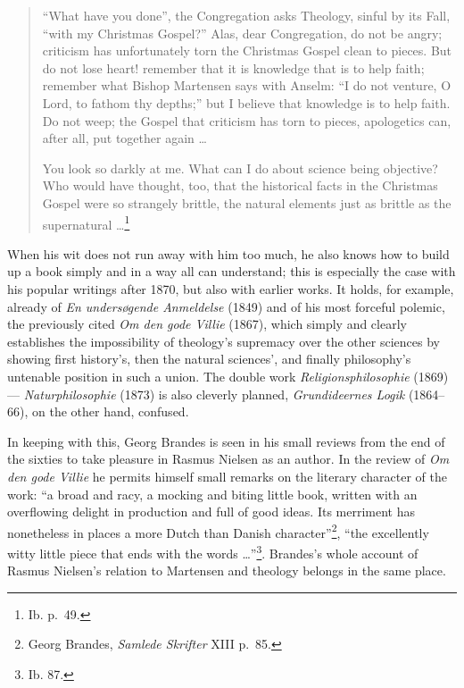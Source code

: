 \documentclass[12pt,a4paper,openany]{book}
\newcommand{\opage}[1]{\marginnote{\footnotesize\textit{[#1]}}}
\begin{document}
\begin{quote}\small

``What have you done'', the Congregation asks Theology, sinful by its Fall, ``with my Christmas Gospel?'' Alas,
dear Congregation, do not be
\opage{150}\setcounter{footnote}{0}%
angry; criticism has unfortunately torn the Christmas Gospel clean to pieces. But do not lose heart! remember that
it is knowledge that is to help faith; remember what Bishop Martensen says with Anselm: ``I do not venture, O Lord,
to fathom thy depths;'' but I believe that knowledge is to help faith. Do not weep; the Gospel that criticism has
torn to pieces, apologetics can, after all, put together again \dots{}

You look so darkly at me. What can I do about science being objective? Who would have thought, too, that the
historical facts in the Christmas Gospel were so strangely brittle, the natural elements just as brittle as the
supernatural \dots{}\footnote{Ib. p.~49.}

\medskip

\end{quote}

When his wit does not run away with him too much, he also knows how to build up a book simply and in a way all can
understand; this is especially the case with his popular writings after 1870, but also with earlier works. It holds,
for example, already of \textit{En undersøgende Anmeldelse} (1849) and of his most forceful polemic, the
previously cited \textit{Om den gode Villie} (1867), which simply and clearly establishes the impossibility of
theology's supremacy over the other sciences by showing first history's, then the natural sciences', and finally
philosophy's untenable position in such a union. The double work \textit{Religionsphilosophie} (1869) ---
\textit{Naturphilosophie} (1873) is also cleverly planned, \textit{Grundideernes Logik} (1864--66), on the other
hand, confused.

In keeping with this, Georg Brandes is seen in his small reviews from the end of the sixties to take pleasure in
Rasmus Nielsen as an author. In the review of \textit{Om den gode Villie} he permits himself small remarks on the
literary character of the work: ``a broad and racy, a mocking and biting little book, written with an overflowing
delight in production and full of good ideas. Its merriment has nonetheless in places a more Dutch than Danish
character''\footnote{Georg Brandes, \textit{Samlede Skrifter} XIII p.~85.}, ``the excellently witty little piece
that ends with the words \dots{}''\footnote{Ib. 87.}. Brandes's whole account of Rasmus Nielsen's relation to
Martensen and theology belongs in the same place.
\end{document}
